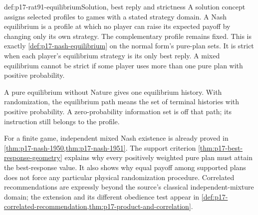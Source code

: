 \begin{hbdefinition}{def:p17-rat91-equilibrium}{Solution, best reply and strictness}
A solution concept assigns selected profiles to games with a stated
strategy domain. A Nash equilibrium is a profile at which no player
can raise its expected payoff by changing only its own strategy.
The complementary profile remains fixed. This is exactly
\cref{def:p17-nash-equilibrium} on the normal form's pure-plan sets.
It is strict when each player's equilibrium strategy is its only
best reply. A mixed equilibrium cannot be strict if some player
uses more than one pure plan with positive probability.

A pure equilibrium without Nature gives one equilibrium history.
With randomization, the equilibrium path means the set of terminal
histories with positive probability. A zero-probability information
set is off that path; its instruction still belongs to the profile.
\end{hbdefinition}

For a finite game, independent mixed Nash existence is already proved
in \cref{thm:p17-nash-1950,thm:p17-nash-1951}. The support criterion
\cref{thm:p17-best-response-geometry} explains why every positively
weighted pure plan must attain the best-response value. It also shows
why equal payoff among supported plans does not force any particular
physical randomization procedure. Correlated recommendations are
expressly beyond the source's classical independent-mixture domain;
the extension and its different obedience test appear in
\cref{def:p17-correlated-recommendation,thm:p17-product-and-correlation}.


